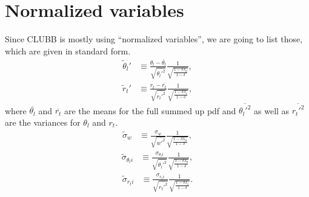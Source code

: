 \section{Normalized variables}\label{sec:normvars}

Since \gls{CLUBB} is mostly using \enquote{normalized variables},
we are going to list those, which are given in standard form.
\begin{align}
    \tilde{\theta}_l'
    &\equiv \frac{\theta_l - \overline{\theta_l}}{\sqrt{\overline{\theta_l'^2}}}\frac{1}{\sqrt{\frac{1 - \delta \lambda_\theta}{1 - \delta}}}, \label{eq:theta_l_prime_tilde}
\end{align}
\begin{align}
    \tilde{r}_t'
    &\equiv \frac{r_t - \overline{r_t}}{\sqrt{\overline{r_t'^2}}}\frac{1}{\sqrt{\frac{1 - \delta \lambda_r}{1 - \delta}}}, \label{eq:r_t_prime_tilde}
\end{align}
where $\overline{\theta_l}$ and $\overline{r_t}$ are the means for the full summed up \gls{pdf}
and $\overline{\theta_l'^2}$ as well as $\overline{r_t'^2}$ are the variances for $\theta_l$ and $r_t$.
\begin{align}
    \tilde{\sigma}_w
    &\equiv \frac{\sigma_w}{\sqrt{\overline{w'^2}}}
    \frac{1}{\sqrt{\frac{1-\delta\lambda_w}{1-\delta}}}, \label{eq:sigma_w_tilde}
\end{align}
\begin{align}
    \tilde{\sigma}_{\theta_l i}
    &\equiv \frac{\sigma_{\theta_l i}}{\sqrt{\overline{\theta_l'^2}}}
    \frac{1}{\sqrt{\frac{1-\delta\lambda_\theta}{1-\delta}}}, \label{eq:sigma_theta_l_i_tilde}
\end{align}
\begin{align}
    \tilde{\sigma}_{r_t i}
    &\equiv \frac{\sigma_{r_t i}}{\sqrt{\overline{r_t'^2}}}
    \frac{1}{\sqrt{\frac{1-\delta\lambda_r}{1-\delta}}}. \label{eq:sigma_r_t_i_tilde}
\end{align}